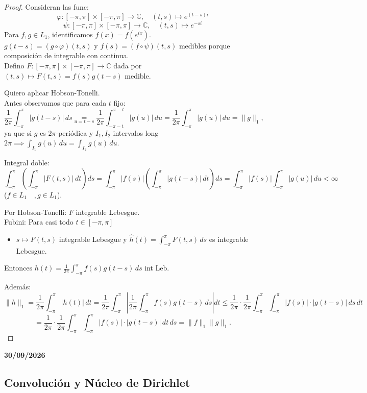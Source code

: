 \begin{proof}
Consideran las func:
\[
\varphi: [-\pi, \pi] \times [-\pi, \pi] \longrightarrow \mathbb{C}, \quad (t, s) \longmapsto e^{(t - s)i}
\]
\[
\psi: [-\pi, \pi] \times [-\pi, \pi] \longrightarrow \mathbb{C}, \quad (t, s) \longmapsto e^{-si}
\]
Para $f, g \in L_1$, identificamos $f(x) = f(e^{i x})$. \\
$g(t - s) = (g \circ \varphi)(t, s)$ y $f(s) = (f \circ \psi)(t, s)$ medibles porque composición de integrable con continua. \\
Defino $F: [-\pi, \pi] \times [-\pi, \pi] \longrightarrow \mathbb{C}$ dada por $(t, s) \longmapsto F(t, s) = f(s) g(t - s)$ medible.

Quiero aplicar Hobson-Tonelli. \\
Antes observamos que para cada $t$ fijo:
\[
\frac{1}{2\pi} \int_{-\pi}^\pi |g(t - s)| \, ds \underset{u = t - s}{=} \frac{1}{2\pi} \int_{-\pi - t}^{\pi - t} |g(u)| \, du = \frac{1}{2\pi} \int_{-\pi}^\pi |g(u)| \, du = \|g\|_1,
\]
ya que si $g$ es $2\pi$-periódica y $I_1, I_2$ intervalos long $2\pi \implies \int_{I_1} g(u) \, du = \int_{I_2} g(u) \, du$.

Integral doble:
\[
\int_{-\pi}^\pi \left( \int_{-\pi}^\pi |F(t, s)| \, dt \right) ds = \int_{-\pi}^\pi |f(s)| \left( \int_{-\pi}^\pi |g(t - s)| \, dt \right) ds = \int_{-\pi}^\pi |f(s)| \int_{-\pi}^\pi |g(u)| \, du < \infty 
\]
($f \in L_1 \quad, g \in L_1$). 


Por Hobson-Tonelli: $F$ integrable Lebesgue. \\
Fubini: Para casi todo $t \in [-\pi, \pi]$
\begin{itemize}
    \item $s \longmapsto F(t, s)$ integrable Lebesgue y $\hat{h}(t) = \int_{-\pi}^\pi F(t, s) \, ds$ es integrable Lebesgue.
\end{itemize}
Entonces $h(t) = \frac{1}{2\pi} \int_{-\pi}^\pi f(s) g(t - s) \, ds$ int Leb.

Además:
\[
\|h\|_1 = \frac{1}{2\pi} \int_{-\pi}^\pi |h(t)| \, dt = \frac{1}{2\pi} \int_{-\pi}^\pi \left| \frac{1}{2\pi} \int_{-\pi}^\pi f(s) g(t - s) \, ds \right| dt \le \frac{1}{2\pi} \cdot \frac{1}{2\pi} \int_{-\pi}^\pi \int_{-\pi}^\pi |f(s)| \cdot |g(t - s)| \, ds \, dt
\]
\[
= \frac{1}{2\pi} \cdot \frac{1}{2\pi} \int_{-\pi}^\pi \int_{-\pi}^\pi |f(s)| \cdot |g(t - s)| \, dt \, ds = \|f\|_1 \|g\|_1.
\]
\end{proof}

\textbf{30/09/2026}

\subsection{Convolución y Núcleo de Dirichlet}

